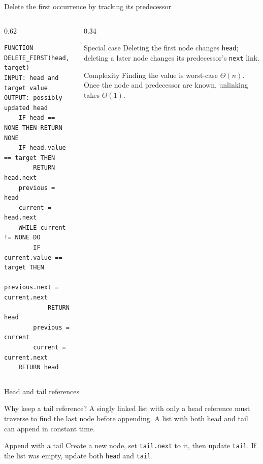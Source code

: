 \documentclass[aspectratio=169]{beamer}
\begin{document}
\begin{frame}[fragile]{Delete the first occurrence by tracking its predecessor}
\begin{columns}[T]
\begin{column}{0.62\textwidth}
\begin{lstlisting}[style=pseudonumbered]
FUNCTION DELETE_FIRST(head, target)
INPUT: head and target value
OUTPUT: possibly updated head
    IF head == NONE THEN RETURN NONE
    IF head.value == target THEN
        RETURN head.next
    previous = head
    current = head.next
    WHILE current != NONE DO
        IF current.value == target THEN
            previous.next = current.next
            RETURN head
        previous = current
        current = current.next
    RETURN head
\end{lstlisting}
\end{column}
\begin{column}{0.34\textwidth}
\begin{block}{Special case}
Deleting the first node changes \texttt{head}; deleting a later node changes its predecessor's \texttt{next} link.
\end{block}
\begin{exampleblock}{Complexity}
Finding the value is worst-case $\Theta(n)$. Once the node and predecessor are known, unlinking takes $\Theta(1)$.
\end{exampleblock}
\end{column}
\end{columns}
\end{frame}

\begin{frame}{Head and tail references}
\small
\begin{block}{Why keep a tail reference?}
A singly linked list with only a head reference must traverse to find the last node before appending. A list with both head and tail can append in constant time.
\end{block}

\begin{center}
\end{center}

\begin{exampleblock}{Append with a tail}
Create a new node, set \texttt{tail.next} to it, then update \texttt{tail}. If the list was empty, update both \texttt{head} and \texttt{tail}.
\end{exampleblock}
\end{frame}
\end{document}

